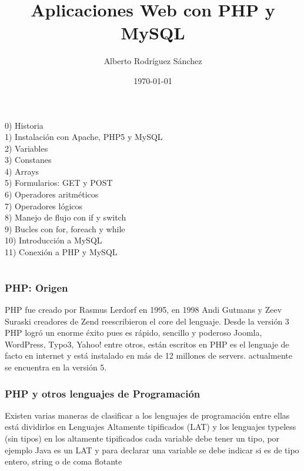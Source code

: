 \documentclass[]{beamer}
\title[PHP y MySQL]{Aplicaciones Web con PHP y MySQL}
\author{Alberto Rodríguez Sánchez}
\institute[UAM]{
Sociedad de Usuarios Linux \\
Universidad Autónoma Metropolitana Unidad Azcapotzalco \\
Codigos y diapositivas del taller: \\
\texttt{http://github.com/Vendaval/slides} \\
}
\date{\today}
\begin{document}
\begin{frame}
\maketitle
\end{frame}

\section[índice]{}
\begin{frame}
0) Historia\\
1) Instalación con Apache, PHP5 y MySQL \\
2) Variables\\
3) Constanes\\
4) Arrays\\
5) Formularios: GET y POST\\
6) Operadores aritméticos\\
7) Operadores lógicos\\
8) Manejo de flujo con if y switch\\
9) Bucles con for, foreach y while\\
10) Introducción a MySQL\\
11) Conexión a PHP y MySQL\\
\end{frame}

\section[Historia]{}
\begin{frame}\frametitle{PHP: Origen}
PHP fue creado por Rasmus Lerdorf en 1995, en 1998 Andi Gutmans y Zeev Suraski creadores de Zend
reescribieron el core del lenguaje. Desde la versión 3 PHP logró un enorme éxito pues es rápido, sencillo y poderoso
Joomla, WordPress, Typo3, Yahoo! entre otros, están escritos en PHP
es el lenguaje de facto en internet y está instalado en más de 12 millones de servers.
actualmente se encuentra en la versión 5.

\end{frame}

\begin{frame}\frametitle{PHP y otros lenguajes de Programación}
Existen varias maneras de clasificar a los lenguajes de programación
entre ellas está dividirlos en Lenguajes Altamente tipificados (LAT) y los lenguajes typeless (sin tipos)
en los altamente tipificados cada variable debe tener un tipo,
por ejemplo Java es un LAT y para declarar una variable se debe indicar si es de
tipo entero, string o de coma flotante

\end{frame}
\end{document}
